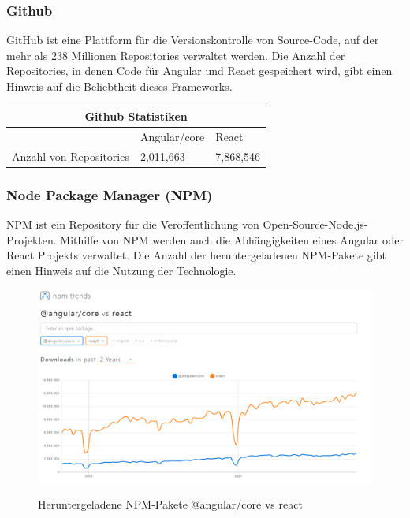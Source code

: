 \subsubsection*{Github}
GitHub ist eine Plattform für die Versionskontrolle von Source-Code, auf der mehr als 238 Millionen Repositories verwaltet werden{\cite{GH07}}.
Die Anzahl der Repositories, in denen Code für Angular und React gespeichert wird, gibt einen Hinweis auf die Beliebtheit dieses Frameworks.
\\
\begin{table}[h!]
  \centering
  \begin{tabular}{ |p{5cm}||p{3.6cm}|p{3.6cm}|  }
    \hline
    \multicolumn{3}{|c|}{Github Statistiken}\\
    \hline
    & Angular/core  {\cite{GH04}}& React {\cite{GH06}}\\
    \hline
    Anzahl von Repositories & 2,011,663& 7,868,546
    \\
    \hline
  \end{tabular}
\end{table}

\newpage
\subsubsection*{Node Package Manager (NPM)}
NPM ist ein Repository für die Veröffentlichung von Open-Source-Node.js-Projekten. Mithilfe von NPM werden auch die Abhängigkeiten eines Angular oder React Projekts verwaltet. Die Anzahl der heruntergeladenen NPM-Pakete gibt einen Hinweis auf die Nutzung der Technologie.
\begin{figure}[h!]
  \centering
  \includegraphics[scale=0.4]{sources/NPM-Trends React_Angular}
  \caption[Heruntergeladene NPM-Pakete]{}
  \label{fig:NPM-Trends React_Angular} 
  Heruntergeladene NPM-Pakete @angular/core vs react
   {\cite{NPM01}}
\end{figure}


